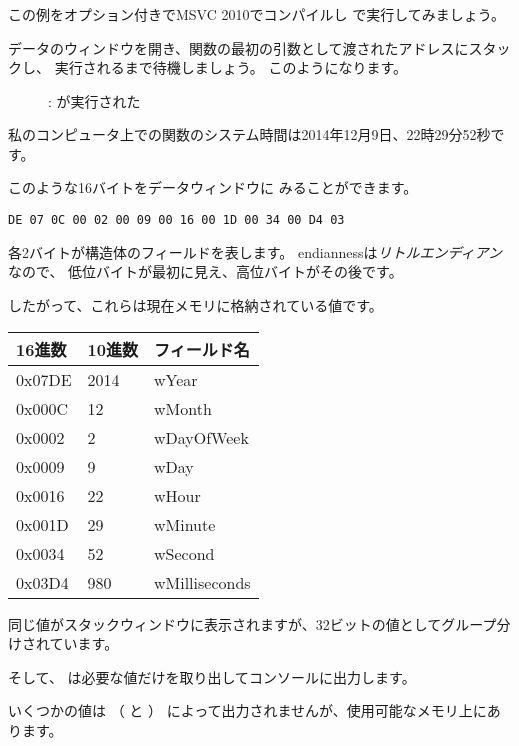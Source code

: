 ﻿\clearpage
\subsubsection{\olly}
\myindex{\olly}

この例をオプション付きでMSVC 2010でコンパイルし \olly で実行してみましょう。

データのウィンドウを開き、関数の最初の引数として渡されたアドレスにスタックし、
実行されるまで待機しましょう。 このようになります。

\begin{figure}[H]
\centering
{}
\caption{\olly:  が実行された}
\label{fig:struct_olly_1}
\end{figure}

私のコンピュータ上での関数のシステム時間は2014年12月9日、22時29分52秒です。



このような16バイトをデータウィンドウに
みることができます。
\begin{lstlisting}
DE 07 0C 00 02 00 09 00 16 00 1D 00 34 00 D4 03
\end{lstlisting}

各2バイトが構造体のフィールドを表します。
\gls{endianness}は\emph{リトルエンディアン}なので、
低位バイトが最初に見え、高位バイトがその後です。

したがって、これらは現在メモリに格納されている値です。

\begin{center}
\begin{tabular}{ | l | l | l | }
\hline
\headercolor{} 16進数 & 
\headercolor{} 10進数 & 
\headercolor{} フィールド名 \\
\hline
0x07DE & 2014	& wYear \\
\hline
0x000C & 12	& wMonth \\
\hline
0x0002 & 2	& wDayOfWeek \\
\hline
0x0009 & 9	& wDay \\
\hline
0x0016 & 22	& wHour \\
\hline
0x001D & 29	& wMinute \\
\hline
0x0034 & 52	& wSecond \\
\hline	
0x03D4 & 980	& wMilliseconds \\
\hline
\end{tabular}
\end{center}

同じ値がスタックウィンドウに表示されますが、32ビットの値としてグループ分けされています。

そして、 \printf は必要な値だけを取り出してコンソールに出力します。

いくつかの値は \printf （ と ）
によって出力されませんが、使用可能なメモリ上にあります。
